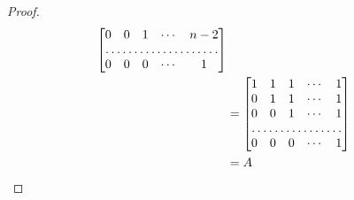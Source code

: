 \documentclass[twoside,openright]{book}
\begin{document}
\begin{CJK*}{UTF8}{}
\begin{proof}
\begin{align*}
\begin{bmatrix}
0               & 0               & 1               & \cdots & n-2               \\
\hdotsfor{5}                                                                     \\
0               & 0               & 0               & \cdots & 1
\end{bmatrix} \\ &=\begin{bmatrix}
1               & 1               & 1               & \cdots & 1                 \\
0               & 1               & 1               & \cdots & 1                 \\
0               & 0               & 1               & \cdots & 1                 \\
\hdotsfor{5}                                                                     \\
0               & 0               & 0               & \cdots & 1
\end{bmatrix}\\&=A
\end{align*}
\end{proof}


\end{CJK*}
\end{document}
